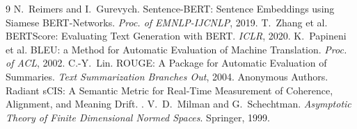 \documentclass[11pt]{article}
\theoremstyle{definition}
\begin{document}
\begin{thebibliography}{9}
N.~Reimers and I.~Gurevych.
\newblock Sentence-BERT: Sentence Embeddings using Siamese BERT-Networks.
\newblock \emph{Proc. of EMNLP-IJCNLP}, 2019.
T.~Zhang et al.
\newblock BERTScore: Evaluating Text Generation with BERT.
\newblock \emph{ICLR}, 2020.
K.~Papineni et al.
\newblock BLEU: a Method for Automatic Evaluation of Machine Translation.
\newblock \emph{Proc. of ACL}, 2002.
C.-Y.~Lin.
\newblock ROUGE: A Package for Automatic Evaluation of Summaries.
\newblock \emph{Text Summarization Branches Out}, 2004.
Anonymous Authors.
\newblock Radiant sCIS: A Semantic Metric for Real‑Time Measurement of Coherence, Alignment, and Meaning Drift.
.
V.~D.~Milman and G.~Schechtman.
\newblock \emph{Asymptotic Theory of Finite Dimensional Normed Spaces}.
\newblock Springer, 1999.
\end{thebibliography}
\end{document}
